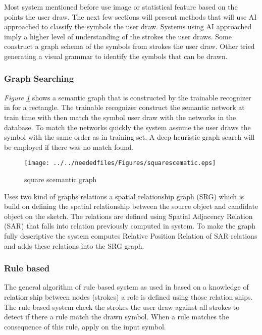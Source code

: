 Most system mentioned before use image or statistical feature based on the points the user draw. The next few sections will present methods that will use AI approached to classify the symbols the user draw.  Systems using AI approached imply a higher level of understanding of the strokes the user draws. Some construct a graph schema of the symbols from strokes the user draw. Other tried generating a visual grammar to identify the symbols that can be drawn.


\subsubsection{Graph Searching }
\label{sec:Graph Searching }

\textit{Figure \ref{fig:squarescematic}} shows a semantic graph that is constructed by the trainable recognizer in  \cite{mulitstroke5} for a rectangle. The trainable recognizer construct the semantic network at train time with then match the symbol user draw with the networks in the database. To match the networks quickly the system assume the user draws the symbol with the same order as in training set. A deep heuristic graph search will be employed if there was no match found.

\begin{figure}
	\centering
		\texttt{[image: ../../neededfiles/Figures/squarescematic.eps]}
	\caption{square scemantic graph}
	\label{fig:squarescematic}
\end{figure}


\cite{SRGraph57}  Uses two kind of graphs relations a spatial relationship graph (SRG) which is build on defining the spatial relationship between the source object and candidate object on the sketch. The relations are defined using Spatial Adjacency Relation (SAR) that falls into relation previously computed in system.   To make the graph fully descriptive the system computes Relative Position Relation of SAR relations and adds these relations into the SRG graph.

\subsubsection{Rule based }
\label{sec:Rule based }


The general algorithm of rule based system as used in \cite{interpretationmechanical50,SmartSketch56}  based on a knowledge of relation ship between nodes (strokes) a role is defined using those relation ships. The rule based system check the strokes the user draw against all strokes to detect if there a rule match the drawn symbol. When a rule matches the consequence of this rule, apply on the input symbol.


